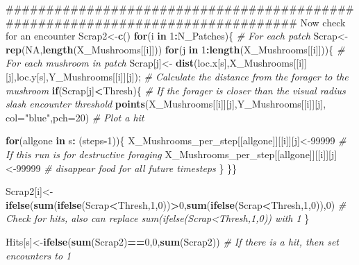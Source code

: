 \documentclass[]{article}
\newenvironment{Shaded}{\begin{snugshade}}{\end{snugshade}}
\newcommand{\KeywordTok}[1]{\textcolor[rgb]{0.13,0.29,0.53}{\textbf{#1}}}
\newcommand{\DataTypeTok}[1]{\textcolor[rgb]{0.13,0.29,0.53}{#1}}
\newcommand{\DecValTok}[1]{\textcolor[rgb]{0.00,0.00,0.81}{#1}}
\newcommand{\StringTok}[1]{\textcolor[rgb]{0.31,0.60,0.02}{#1}}
\newcommand{\CommentTok}[1]{\textcolor[rgb]{0.56,0.35,0.01}{\textit{#1}}}
\newcommand{\OtherTok}[1]{\textcolor[rgb]{0.56,0.35,0.01}{#1}}
\newcommand{\ControlFlowTok}[1]{\textcolor[rgb]{0.13,0.29,0.53}{\textbf{#1}}}
\newcommand{\OperatorTok}[1]{\textcolor[rgb]{0.81,0.36,0.00}{\textbf{#1}}}
\newcommand{\NormalTok}[1]{#1}
\begin{document}
\begin{Shaded}
\begin{Highlighting}[]
{\NormalTok{############################################################################### Now check for an encounter }
\NormalTok{ Scrap2<-}\KeywordTok{c}\NormalTok{()}
 \ControlFlowTok{for}\NormalTok{(i }\ControlFlowTok{in} \DecValTok{1}\OperatorTok{:}\NormalTok{N_Patches)\{                                                         }\CommentTok{# For each patch}
\NormalTok{  Scrap<-}\KeywordTok{rep}\NormalTok{(}\OtherTok{NA}\NormalTok{,}\KeywordTok{length}\NormalTok{(X_Mushrooms[[i]]))}
 \ControlFlowTok{for}\NormalTok{(j }\ControlFlowTok{in} \DecValTok{1}\OperatorTok{:}\KeywordTok{length}\NormalTok{(X_Mushrooms[[i]]))\{                                          }\CommentTok{# For each mushroom in patch}
\NormalTok{ Scrap[j]<-}\StringTok{ }\KeywordTok{dist}\NormalTok{(loc.x[s],X_Mushrooms[[i]][j],loc.y[s],Y_Mushrooms[[i]][j]);    }\CommentTok{# Calculate the distance from the forager to the mushroom}
 \ControlFlowTok{if}\NormalTok{(Scrap[j]}\OperatorTok{<}\NormalTok{Thresh)\{                                                           }\CommentTok{# If the forager is closer than the visual radius slash encounter threshold}
 \KeywordTok{points}\NormalTok{(X_Mushrooms[[i]][j],Y_Mushrooms[[i]][j], }\DataTypeTok{col=}\StringTok{"blue"}\NormalTok{,}\DataTypeTok{pch=}\DecValTok{20}\NormalTok{)             }\CommentTok{# Plot a hit}

       \ControlFlowTok{for}\NormalTok{(allgone }\ControlFlowTok{in}\NormalTok{ s}\OperatorTok{:}\StringTok{ }\NormalTok{(steps}\OperatorTok{-}\DecValTok{1}\NormalTok{))\{}
\NormalTok{       X_Mushrooms_per_step[[allgone]][[i]][j]<-}\DecValTok{99999}                           \CommentTok{# If this run is for destructive foraging}
\NormalTok{       X_Mushrooms_per_step[[allgone]][[i]][j]<-}\DecValTok{99999}                           \CommentTok{# disappear food for all future timesteps}
\NormalTok{      \}}
\NormalTok{ \}\}}
 
\NormalTok{ Scrap2[i]<-}\StringTok{ }\KeywordTok{ifelse}\NormalTok{(}\KeywordTok{sum}\NormalTok{(}\KeywordTok{ifelse}\NormalTok{(Scrap}\OperatorTok{<}\NormalTok{Thresh,}\DecValTok{1}\NormalTok{,}\DecValTok{0}\NormalTok{))}\OperatorTok{>}\DecValTok{0}\NormalTok{,}\KeywordTok{sum}\NormalTok{(}\KeywordTok{ifelse}\NormalTok{(Scrap}\OperatorTok{<}\NormalTok{Thresh,}\DecValTok{1}\NormalTok{,}\DecValTok{0}\NormalTok{)),}\DecValTok{0}\NormalTok{)      }\CommentTok{# Check for hits, also can replace sum(ifelse(Scrap<Thresh,1,0)) with 1}
\NormalTok{ \}}
 
\NormalTok{ Hits[s]<-}\KeywordTok{ifelse}\NormalTok{(}\KeywordTok{sum}\NormalTok{(Scrap2)}\OperatorTok{==}\DecValTok{0}\NormalTok{,}\DecValTok{0}\NormalTok{,}\KeywordTok{sum}\NormalTok{(Scrap2))                                            }\CommentTok{# If there is a hit, then set encounters to 1}
  
}
\end{Highlighting}
\end{Shaded}
\end{document}

